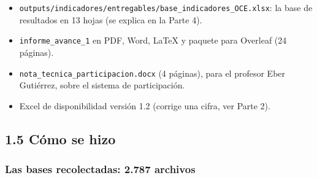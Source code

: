 \documentclass[11pt,letterpaper]{article}
\begin{document}
\begin{itemize}
\item \texttt{\footnotesize outputs/\allowbreak{}indicadores/\allowbreak{}entregables/\allowbreak{}base\_\allowbreak{}indicadores\_\allowbreak{}OCE.\allowbreak{}xlsx}: la base de resultados en 13 hojas (se explica en la Parte 4).
\item \texttt{\footnotesize informe\_\allowbreak{}avance\_\allowbreak{}1} en PDF, Word, LaTeX y paquete para Overleaf (24 páginas).
\item \texttt{\footnotesize nota\_\allowbreak{}tecnica\_\allowbreak{}participacion.\allowbreak{}docx} (4 páginas), para el profesor Eber Gutiérrez, sobre el sistema de participación.
\item Excel de disponibilidad versión 1.2 (corrige una cifra, ver Parte 2).
\end{itemize}

\subsection*{1.5 Cómo se hizo}


\subsubsection*{Las bases recolectadas: 2.787 archivos}
\end{document}
